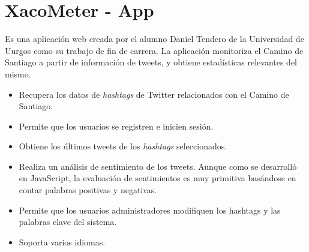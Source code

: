
\section{XacoMeter - App}
Es una aplicación web creada por el alumno Daniel Tendero de la Universidad de Uurgos como su trabajo de fin de carrera. La aplicación monitoriza el Camino de Santiago a partir de información de tweets, y obtiene estadísticas relevantes del mismo.
\begin{itemize}
    \item Recupera los datos de \textit{hashtags} de Twitter relacionados con el Camino de Santiago.
    \item Permite que los usuarios se registren e inicien sesión.
    \item Obtiene los últimos tweets de los \textit{hashtags} seleccionados.
    \item Realiza un análisis de sentimiento de los tweets. Aunque como se desarrolló en JavaScript, la evaluación de sentimientos es muy primitiva basándose en contar palabras positivas y negativas.
    \item Permite que los usuarios administradores modifiquen los hashtags y las palabras clave del sistema.
    \item Soporta varios idiomas.
\end{itemize}






